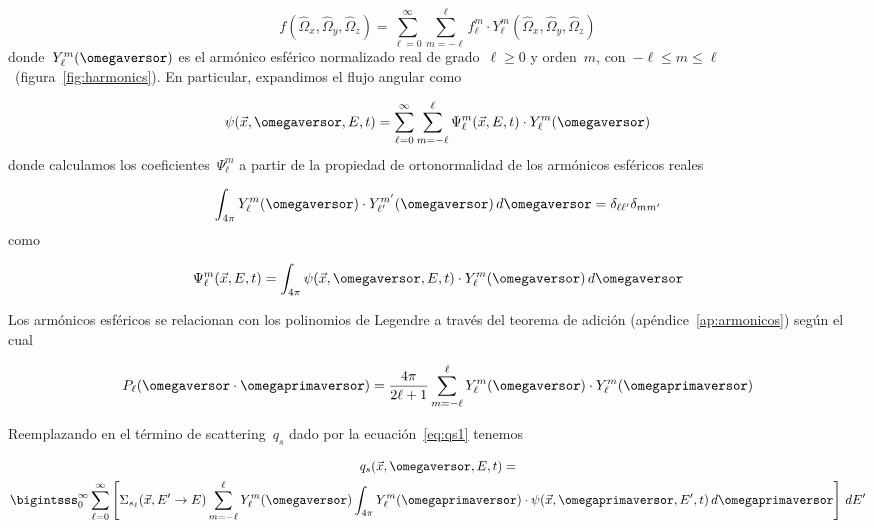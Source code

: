 \begin{equation*}
f(\hat\Omega_x, \hat\Omega_y, \hat\Omega_z) = \sum_{\ell=0}^\infty \sum_{m=-\ell}^\ell f_\ell^m \cdot Y_\ell^m(\hat\Omega_x, \hat\Omega_y, \hat\Omega_z)
\end{equation*}
%
donde~$Y_{\ell}^{m} ({\omegaversor})$ es el armónico esférico normalizado real de grado~$\ell \geq 0$ y orden~$m$, con~$-\ell \leq m \leq \ell$~(figura~\ref{fig:harmonics}). En particular, expandimos el flujo angular como

\begin{equation}
\label{eq:psiarmonicos}
 \psi(\vec{x}, \omegaversor, E, t) = \sum_{\ell=0}^{\infty} \sum_{m=-\ell}^{\ell} \Psi_\ell^m (\vec{x}, E, t) \cdot Y_{\ell}^{m} ({\omegaversor})
\end{equation}
%
donde calculamos los coeficientes~$\Psi_\ell^m$ a partir de la propiedad de ortonormalidad de los armónicos esféricos reales

\begin{equation}
\label{eq:ortogonalidadarmonicos}
 \int_{4\pi} Y_{\ell}^{m}(\omegaversor) \cdot Y_{\ell^\prime}^{m^\prime}(\omegaversor) \, d\omegaversor = \delta_{\ell \ell^\prime} \delta_{m m^\prime}
\end{equation}
%
como

\begin{equation}
\label{eq:psiellm}
 \Psi_\ell^m (\vec{x}, E, t) = \int_{4\pi} \psi(\vec{x}, \omegaversor, E, t) \cdot Y_{\ell}^{m}(\omegaversor) \, d\omegaversor
\end{equation}


\medskip

Los armónicos esféricos se relacionan con los polinomios de Legendre a través del teorema de adición (apéndice~\ref{ap:armonicos}) según el cual

\begin{equation*}
 P_\ell(\omegaversor \cdot \omegaprimaversor) = \frac{4\pi}{2\ell + 1} 
\sum_{m=-\ell}^{\ell} Y_\ell^{m}(\omegaversor) \cdot Y_\ell^m(\omegaprimaversor) 
\end{equation*}

Reemplazando en el término de scattering~$q_s$ dado por la ecuación~\eqref{eq:qs1} tenemos

\begin{multline*}
q_s(\vec{x}, \omegaversor, E, t) = \\
\bigintsss_{0}^{\infty} \sum_{\ell=0}^\infty \left[ \Sigma_{s_\ell}(\vec{x}, E^{\prime} \rightarrow E) 
\sum_{m=-\ell}^{\ell} Y_\ell^{m}(\omegaversor) \int_{4\pi}
 Y_\ell^m(\omegaprimaversor) \cdot \psi(\vec{x}, \omegaprimaversor,E^\prime,t)\, d\omegaprimaversor \right] \, dE^{\prime}
\end{multline*}

